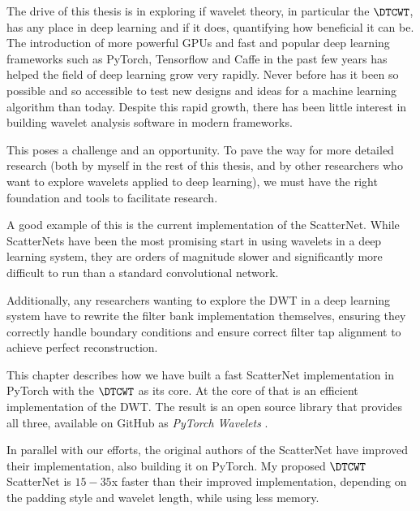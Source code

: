 The drive of this thesis is in exploring if wavelet theory, in
particular the $\DTCWT$, has any place in deep learning and if it does,
quantifying how beneficial it can be. The introduction of more powerful GPUs and
fast and popular deep learning frameworks such as PyTorch, Tensorflow and Caffe
in the past few years has helped the field of deep learning grow very rapidly.
Never before has it been so possible and so accessible to test new designs and
ideas for a machine learning algorithm than today. Despite this rapid growth,
there has been little interest in building wavelet analysis software in modern
frameworks. 

This poses a challenge and an opportunity. To pave the way for more detailed 
research (both by myself in the rest of this thesis, and by other researchers
who want to explore wavelets applied to deep learning), we must have the right
foundation and tools to facilitate research.

A good example of this is the current implementation of the ScatterNet. While
ScatterNets have been the most promising start in using wavelets in a deep
learning system, they are orders of magnitude slower and significantly more
difficult to run than a standard convolutional network. 

Additionally, any researchers wanting to explore the DWT in a deep learning
system have to rewrite the filter bank implementation themselves, ensuring they
correctly handle boundary conditions and ensure correct filter tap alignment to
achieve perfect reconstruction.

This chapter describes how we have built a fast ScatterNet implementation in 
PyTorch with the $\DTCWT$ as its core. At the core of that is an efficient 
implementation of the DWT\@. The result is an open source library that provides
all three, available on GitHub as \emph{PyTorch Wavelets} \cite{pytorch_wavelets}.

In parallel with our efforts, the original authors of the ScatterNet have
improved their implementation, also building it on PyTorch. My proposed
$\DTCWT$ ScatterNet is $15-35$x faster than their improved implementation,
depending on the padding style and wavelet length, while using less memory. 

